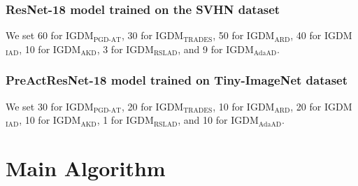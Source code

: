\documentclass{article} %
\begin{document}
\subsubsection{ResNet-18 model trained on the SVHN dataset}
We set 60 for IGDM$_{\text{PGD-AT}}$, 30 for IGDM$_{\text{TRADES}}$, 50 for IGDM$_{\text{ARD}}$, 40 for IGDM$_{\text{IAD}}$, 10 for IGDM$_{\text{AKD}}$, 3 for IGDM$_{\text{RSLAD}}$, and 9 for IGDM$_{\text{AdaAD}}$.

\subsubsection{PreActResNet-18 model trained on Tiny-ImageNet dataset}
We set 30 for IGDM$_{\text{PGD-AT}}$, 20 for IGDM$_{\text{TRADES}}$, 10 for IGDM$_{\text{ARD}}$, 20 for IGDM$_{\text{IAD}}$, 10 for IGDM$_{\text{AKD}}$, 1 for IGDM$_{\text{RSLAD}}$, and 10 for IGDM$_{\text{AdaAD}}$.



























\section{Main Algorithm}
\end{document}

